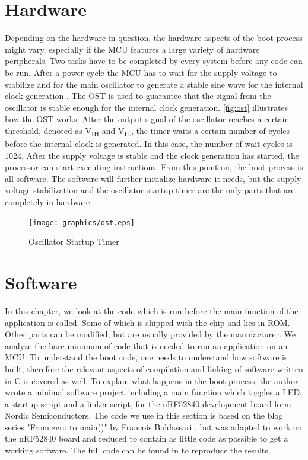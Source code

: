\documentclass[a4paper,12pt]{article}
\begin{document}
\section{Hardware}\label{sec:hardware}
Depending on the hardware in question, the hardware aspects of the boot process might vary, especially if the \ac{MCU} features a large variety of hardware peripherals. Two tasks have to be completed by every system before any code can be run. After a power cycle the \ac{MCU} has to wait for the supply voltage to stabilize and for the main oscillator to generate a stable sine wave for the internal clock generation \cite{microchip2023}. The \ac{OST} is used to guarantee that the signal from the oscillator is stable enough for the internal clock generation. \autoref{fig:ost} illustrates how the \ac{OST} works. After the output signal of the oscillator reaches a certain threshold, denoted as V\textsubscript{IH} and V\textsubscript{IL}, the timer waits a certain number of cycles before the internal clock is generated. In this case, the number of wait cycles is 1024. After the supply voltage is stable and the clock generation has started, the processor can start executing instructions. From this point on, the boot process is all software. The software will further initialize hardware it needs, but the supply voltage stabilization and the oscillator startup timer are the only parts that are completely in hardware.

\begin{figure}[H]
\texttt{[image: graphics/ost.eps]}
\centering{}
\caption{Oscillator Startup Timer \cite{microchip2023}}
\label{fig:ost}
\end{figure}
\newpage

\section{Software}\label{sec:minSoft}
In this chapter, we look at the code which is run before the main function of the application is called. Some of which is shipped with the chip and lies in \ac{ROM}. Other parts can be modified, but are usually provided by the manufacturer. We analyze the bare minimum of code that is needed to run an application on an \ac{MCU}. To understand the boot code, one needs to understand how software is built, therefore the relevant aspects of compilation and linking of software written in C is covered as well. To explain what happens in the boot process, the author wrote a minimal software project including a main function which toggles a \ac{LED}, a startup script and a linker script, for the nRF52840 development board form Nordic Semiconductors. The code we use in this section is based on the blog series "From zero to main()" by Francois Baldassari \cite{Interrupt}, but was adapted to work on the nRF52840 board and reduced to contain as little code as possible to get a working software. The full code can be found in \cite{lorv_eva1} to reproduce the results.
\end{document}
